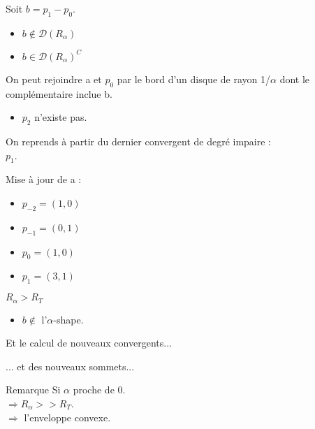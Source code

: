 \documentclass{beamer}
\begin{document}
\begin{frame}
\begin{columns}[t]
\begin{column}{3cm}
\begin{block}{}
{        }
        {
          Soit $b = p_{1} - p_{0}$.
          \begin{itemize}
            \item $b \notin \mathcal{D} \left( R_{\alpha} \right)$
            \item $b \in \mathcal{D} \left( R_{\alpha} \right)^C$
          \end{itemize}
          On peut rejoindre a et $p_0$ par le bord d'un disque de rayon 1/$\alpha$ dont le complémentaire inclue b.
        }        
        {
          \begin{itemize}
            \item $p_{2}$ n'existe pas.
          \end{itemize} 
          On reprends à partir du dernier convergent de degré impaire :\\
          $p_1$.\\
        }
        {
          Mise à jour de a : \\
          \begin{itemize}
            \item $p_{-2} = (1, 0)$
            \item $p_{-1} = (0, 1)$
            \item $p_{0} = (1, 0)$
            \item $p_{1} = (3, 1)$
          \end{itemize} 
        }
        {
          \alert{$R_{\alpha} > R_T$}\\
            \begin{itemize}
              \item $b \notin$ l'$\alpha$-shape.
            \end{itemize}
            Et le calcul de nouveaux convergents... 
        }
        {
          ... et des nouveaux sommets...\\
        }
      \end{block}
      {
        \begin{block}{Remarque}
          \alert{Si $\alpha$ proche de 0.}\\
          \alert{$\Rightarrow R_{\alpha} >> R_T$.}\\
          \alert{$\Rightarrow$ l'enveloppe convexe.}\\

        \end{block} 
      }     
    \end{column}
  \end{columns} 

\end{frame}
\end{document}
